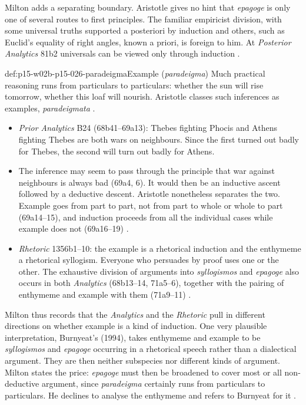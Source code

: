 Milton adds a separating boundary. Aristotle gives no hint that
\emph{epagoge} is only one of several routes to first principles. The
familiar empiricist division, with some universal truths supported a
posteriori by induction and others, such as Euclid's equality of right
angles, known a priori, is foreign to him. At \emph{Posterior Analytics}
81b2 universals can be viewed only through induction
\cite[p.~6]{Milton2011InductionBeforeHume}.

\begin{hbdefinition}{def:p15-w02b-p15-026-paradeigma}{Example (\emph{paradeigma})}
Much practical reasoning runs from particulars to particulars: whether the
sun will rise tomorrow, whether this loaf will nourish. Aristotle classes
such inferences as examples, \emph{paradeigmata}
\cite[pp.~6--7]{Milton2011InductionBeforeHume}.
\begin{itemize}
\item \emph{Prior Analytics} B24 (68b41--69a13): Thebes fighting Phocis
  and Athens fighting Thebes are both wars on neighbours. Since the first
  turned out badly for Thebes, the second will turn out badly for
  Athens.
\item The inference may seem to pass through the principle that war
  against neighbours is always bad (69a4, 6). It would then be an inductive
  ascent followed by a deductive descent. Aristotle nonetheless separates the
  two. Example goes from part to part, not from part to whole or whole to
  part (69a14--15), and induction proceeds from all the individual cases
  while example does not (69a16--19)
  \cite[p.~7]{Milton2011InductionBeforeHume}.
\item \emph{Rhetoric} 1356b1--10: the example is a rhetorical induction and
  the enthymeme a rhetorical syllogism. Everyone who persuades by proof uses
  one or the other. The exhaustive division of arguments into
  \emph{syllogismos} and \emph{epagoge} also occurs in both
  \emph{Analytics} (68b13--14, 71a5--6), together with the pairing of
  enthymeme and example with them (71a9--11)
  \cite[p.~7]{Milton2011InductionBeforeHume}.
\end{itemize}
\end{hbdefinition}

Milton thus records that the \emph{Analytics} and the \emph{Rhetoric}
pull in different directions on whether example is a kind of induction.
One very plausible interpretation, Burnyeat's (1994), takes enthymeme and
example to be \emph{syllogismos} and \emph{epagoge} occurring in a
rhetorical speech rather than a dialectical argument. They are then
neither subspecies nor different kinds of argument. Milton states the
price: \emph{epagoge} must then be broadened to cover most or all
non-deductive argument, since \emph{paradeigma} certainly runs from
particulars to particulars. He declines to analyse the enthymeme and
refers to Burnyeat for it \cite[p.~7]{Milton2011InductionBeforeHume}.

